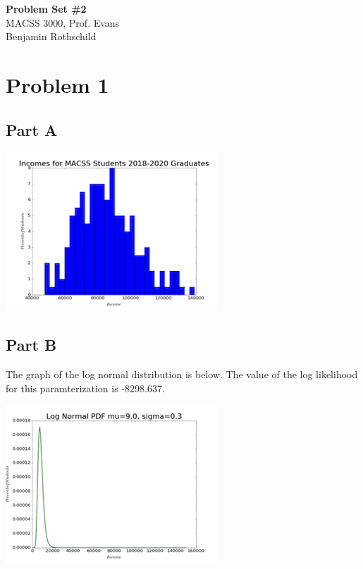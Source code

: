 \documentclass{article}
\begin{document}
\begin{flushleft}
    \textbf{\large{Problem Set \#2}} \\
    MACSS 3000, Prof. Evans \\
    Benjamin Rothschild
\end{flushleft}

\section*{Problem 1}
\subsection*{Part A}
\begin{center}
\includegraphics{img1a.png}
\end{center}

\subsection*{Part B}
The graph of the log normal distribution is below.  The value of the log likelihood for this paramterization is -8298.637.
\begin{center}\includegraphics{img1b.png}\end{center}
\end{document}
